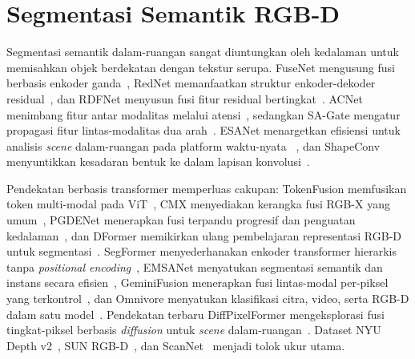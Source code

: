 \documentclass[11pt,a4paper]{article}
\begin{document}
\section{Segmentasi Semantik RGB-D}
Segmentasi semantik dalam-ruangan sangat diuntungkan oleh kedalaman untuk
memisahkan objek berdekatan dengan tekstur serupa. FuseNet mengusung fusi
berbasis enkoder ganda~\cite{hazirbas2016fusenet}, RedNet memanfaatkan struktur
enkoder-dekoder residual~\cite{jiang2018rednet}, dan RDFNet menyusun fusi fitur
residual bertingkat~\cite{park2017rdfnet}. ACNet menimbang fitur antar modalitas
melalui atensi~\cite{hu2019acnet}, sedangkan SA-Gate mengatur propagasi fitur
lintas-modalitas dua arah~\cite{chen2020sagate}. ESANet menargetkan efisiensi
untuk analisis \emph{scene} dalam-ruangan pada platform waktu-nyata
~\cite{seichter2021esanet}, dan ShapeConv menyuntikkan kesadaran bentuk ke dalam
lapisan konvolusi~\cite{cao2021shapeconv}.

Pendekatan berbasis transformer memperluas cakupan: TokenFusion memfusikan token
multi-modal pada ViT~\cite{wang2022tokenfusion}, CMX menyediakan kerangka fusi
RGB-X yang umum~\cite{zhang2023cmx}, PGDENet menerapkan fusi terpandu progresif
dan penguatan kedalaman~\cite{zhou2022pgdenet}, dan DFormer memikirkan ulang
pembelajaran representasi RGB-D untuk segmentasi~\cite{yin2024dformer}. SegFormer
menyederhanakan enkoder transformer hierarkis tanpa \emph{positional
encoding}~\cite{xie2021segformer}, EMSANet menyatukan segmentasi semantik dan
instans secara efisien~\cite{seichter2022emsanet}, GeminiFusion menerapkan fusi
lintas-modal per-piksel yang terkontrol~\cite{jia2024geminifusion}, dan Omnivore
menyatukan klasifikasi citra, video, serta RGB-D dalam satu
model~\cite{girdhar2022omnivore}. Pendekatan terbaru DiffPixelFormer
mengeksplorasi fusi tingkat-piksel berbasis \emph{diffusion} untuk \emph{scene}
dalam-ruangan~\cite{gong2025diffpixelformer}. Dataset
NYU Depth v2~\cite{silberman2012nyu}, SUN RGB-D~\cite{song2015sunrgbd}, dan
ScanNet~\cite{dai2017scannet} menjadi tolok ukur utama.

\end{document}

